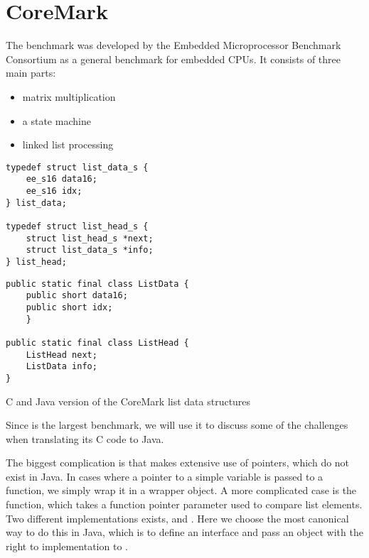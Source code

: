 \section{CoreMark}
\label{sec-evaluation-coremark}

The  benchmark was developed by the Embedded Microprocessor Benchmark Consortium as a general benchmark for embedded CPUs. It consists of three main parts:
\begin{itemize}
  \item matrix multiplication
  \item a state machine
  \item linked list processing
\end{itemize}

\begin{listing}[b]
\centering
\begin{minipage}[t]{0.48\textwidth}
\centering
\begin{verbatim}
typedef struct list_data_s {
    ee_s16 data16;
    ee_s16 idx;
} list_data;

typedef struct list_head_s {
    struct list_head_s *next;
    struct list_data_s *info;
} list_head;
\end{verbatim}
\end{minipage}\hfill
\begin{minipage}[t]{0.48\textwidth}
\centering
\begin{verbatim}
public static final class ListData {
    public short data16;
    public short idx;
    }

public static final class ListHead {
    ListHead next;
    ListData info;
}
\end{verbatim}
\end{minipage}
\caption{C and Java version of the CoreMark list data structures}
\label{lst-coremark-list-data-structures}
\end{listing}

Since  is the largest benchmark, we will use it to discuss some of the challenges when translating its C code to Java.

The biggest complication is that  makes extensive use of pointers, which do not exist in Java. In cases where a pointer to a simple variable is passed to a function, we simply wrap it in a wrapper object. A more complicated case is the  function, which takes a function pointer parameter  used to compare list elements. Two different implementations exists,  and . Here we choose the most canonical way to do this in Java, which is to define an interface and pass an object with the right to implementation to .


